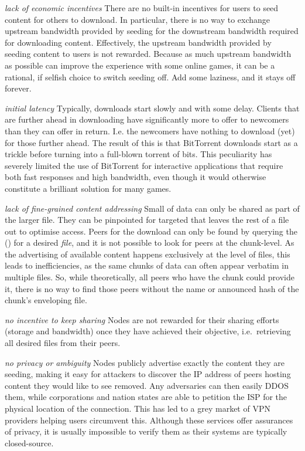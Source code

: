 \begin{labelledlist}
\item[\emph{lack of economic incentives}] 
There are no built-in incentives for users to seed content for others to download. In particular, there is no way to exchange upstream bandwidth provided by seeding for the downstream bandwidth required for downloading content. Effectively, the upstream bandwidth provided by seeding content to users is not rewarded. Because as much upstream bandwidth as possible can improve the experience with some online games, it can be a rational, if selfish choice to switch seeding off. Add some laziness, and it stays off forever.

\item[\emph{initial latency}] 
 Typically, downloads start slowly and with some delay. Clients that are further ahead in downloading have significantly more to offer to newcomers than they can offer in return. I.e. the newcomers have nothing to download (yet) for those further ahead. The result of this is that BitTorrent downloads start as a trickle before turning into a full-blown torrent of bits. This peculiarity has severely limited the use of BitTorrent for interactive applications that require both fast responses and high bandwidth, even though it would otherwise constitute a brilliant solution for many games.
 
\item[\emph{lack of fine-grained content addressing}]
Small  of data can only be shared as part of the larger file. They can be pinpointed for targeted that leaves the rest of a file out to optimise access. Peers for the download can only be found by querying the  () for a desired \emph{file}, and it is not possible to look for peers at the chunk-level. As the advertising of available content happens exclusively at the level of files, this leads to inefficiencies, as the same chunks of data can often appear verbatim in multiple files. So, while theoretically, all peers who have the chunk could provide it, there is no way to find those peers without the name or announced hash of the chunk's enveloping file.

\item[\emph{no incentive to keep sharing}]
Nodes are not rewarded for their sharing efforts (storage and bandwidth) once they have achieved their objective, i.e.\ retrieving all desired files from their peers.

\item[\emph{no privacy or ambiguity}]
Nodes publicly advertise exactly the content they are seeding, making it easy for attackers to discover the IP address of peers hosting content they would like to see removed. Any adversaries can then easily DDOS them, while corporations and nation states are able to petition the ISP for the physical location of the connection. This has led to a grey market of VPN providers helping users circumvent this. Although these services offer assurances of privacy, it is usually impossible to verify them as their systems are typically closed-source. 
\end{labelledlist}

